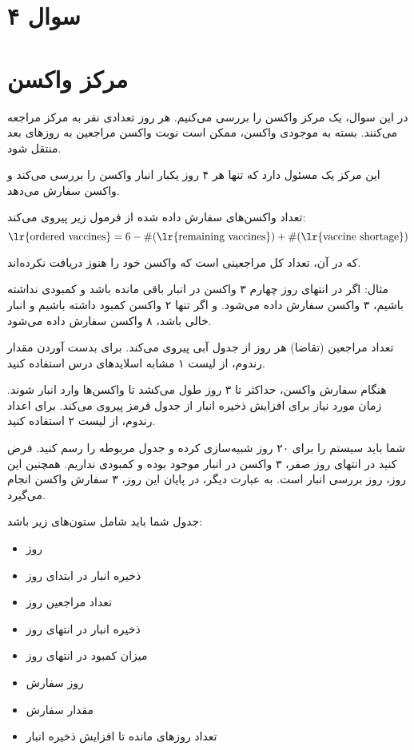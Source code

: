 \section*{سوال ۴}

\section*{مرکز واکسن}

در این سوال، یک مرکز واکسن را بررسی می‌کنیم. هر روز تعدادی نفر به مرکز مراجعه می‌کنند. بسته به موجودی واکسن، ممکن است نوبت واکسن مراجعین به روزهای بعد منتقل شود.

این مرکز یک مسئول دارد که تنها هر ۴ روز یکبار انبار واکسن را بررسی می‌کند و واکسن سفارش می‌دهد.

تعداد واکسن‌های سفارش داده شده از فرمول زیر پیروی می‌کند:
\[ \text{\lr{ordered vaccines}} = 6 - \#(\text{\lr{remaining vaccines}}) + \#(\text{\lr{vaccine shortage}}) \]

که در آن، 
تعداد کل مراجعینی است که واکسن خود را هنوز دریافت نکرده‌اند.

مثال: اگر در انتهای روز چهارم ۳ واکسن در انبار باقی مانده باشد و کمبودی نداشته باشیم، ۳ واکسن سفارش داده می‌شود. و اگر تنها ۲ واکسن کمبود داشته باشیم و انبار خالی باشد، ۸ واکسن سفارش داده می‌شود.


تعداد مراجعین (تقاضا) هر روز از جدول آبی پیروی می‌کند. برای بدست آوردن مقدار رندوم، از لیست ۱ مشابه اسلایدهای درس استفاده کنید.

هنگام سفارش واکسن، حداکثر تا ۳ روز طول می‌کشد تا واکسن‌ها وارد انبار شوند. زمان مورد نیاز برای افزایش ذخیره انبار از جدول قرمز پیروی می‌کند. برای اعداد رندوم، از لیست ۲ استفاده کنید.

شما باید سیستم را برای ۲۰ روز شبیه‌سازی کرده و جدول مربوطه را رسم کنید. فرض کنید در انتهای روز صفر، ۳ واکسن در انبار موجود بوده و کمبودی نداریم. همچنین این روز، روز بررسی انبار است. به عبارت دیگر، در پایان این روز، ۳ سفارش واکسن انجام می‌گیرد.

جدول شما باید شامل ستون‌های زیر باشد:

\begin{itemize}
	\item روز
	\item ذخیره انبار در ابتدای روز
	\item تعداد مراجعین روز
	\item ذخیره انبار در انتهای روز
	\item میزان کمبود در انتهای روز
	\item روز سفارش
	\item مقدار سفارش
	\item تعداد روزهای مانده تا افزایش ذخیره انبار
\end{itemize}

